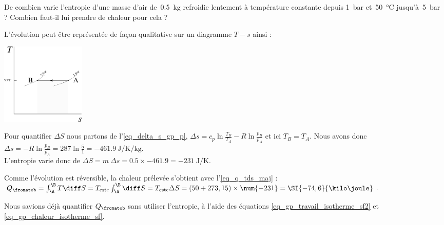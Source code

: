 		\begin{anexample}
			De combien varie l’entropie d’une masse d’air de~\SI{0,5}{\kilogram} refroidie lentement à température constante depuis \SI{1}{\bar} et~\SI{50}{\degreeCelsius} jusqu’à~\SI{5}{\bar} ? Combien faut-il lui prendre de chaleur pour cela ?
			
				\begin{answer}
					L’évolution peut être représentée de façon qualitative sur un diagramme $T-s$ ainsi :
						\begin{center}\includegraphics[width=4cm]{images/exe_ts_2.png}\end{center}
					Pour quantifier $\Delta S$ nous partons de l’\cref{eq_delta_s_gp_p}, $\Delta s = c_p \ln \frac{T_B}{T_A} - R \ln \frac{p_B}{p_A}$ et ici $T_B=T_A$. Nous avons donc $\Delta s = -R \ln \frac{p_B}{p_A} = \num{287} \ln \frac{5}{1} =  \SI{-461,9}{\joule\per\kelvin\per\kilogram}$. \\L’entropie varie donc de $\Delta S = m \ \Delta s = \num{0,5} \times \num{-461,9} = \SI{-231}{\joule\per\kelvin}$. 
					
					Comme l’évolution est réversible, la chaleur prélevée s’obtient avec l’\cref{eq_q_tds_maj} : $Q_{\fromatob} = \int_\A^\B T \diff S = T_\text{cste} \int_\A^\B \diff S = T_\text{cste} \Delta S = (50+273,15) \times \num{-231} = \SI{-74,6}{\kilo\joule}$. 
				
				\begin{remark}Nous savions déjà quantifier $Q_{\fromatob}$ sans utiliser l’entropie, à l’aide des équations \ref{eq_gp_travail_isotherme_sf2} et \ref{eq_gp_chaleur_isotherme_sf}.\end{remark}\end{answer}
		\end{anexample}

